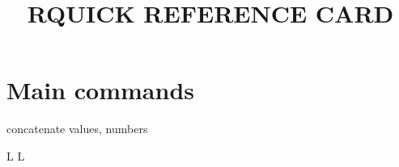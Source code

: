 
\def\content{R}
\def\versionnumber{0.1}  %
\def\year{2014}
\def\month{May}
\def\version{v\versionnumber\ \month\ \year}



\title{\content QUICK REFERENCE CARD}

\shortintro

\section{Main commands}{}
	{concatenate values, numbers}

\copyrightnotice

\supereject
\if L\lr \else\null\vfill\eject\fi
\if L\lr \else\null\vfill\eject\fi
\bye

